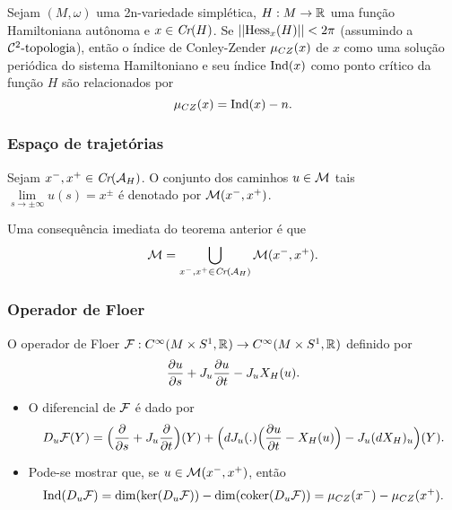 \documentclass{beamer}
\begin{document}
\begin{footnotesize}
\begin{frame}
		
		\begin{corolario}
			Sejam $(M,\omega)$ uma 2n-variedade simplética, $H:M\to \mathbb{R}^{}$ uma função Hamiltoniana autônoma e $x \in \textit{Cr}(H)$. Se $||\text{Hess}_{x}(H)||<2\pi$ (assumindo a $\mathcal{C}^{2}\text{-topologia}$), então o índice de Conley-Zender $\mu_{CZ}(x)$ de $x$ como uma solução periódica do sistema Hamiltoniano e seu índice $\text{Ind}(x)$ como ponto crítico da função $H$ são relacionados por
			$$
			\mu_{CZ}(x) = \text{Ind}(x)-n.
			$$
		\end{corolario}
	\end{frame}
	
	\begin{frame}
	\frametitle{Espaço de trajetórias}		
	Sejam $x^{-}, x^{+}\in \textit{Cr}(\mathcal{A}_{H})$. O conjunto dos caminhos $u \in \mathcal{M}$ tais $\lim\limits_{s\to \pm \infty}u(s) = x^{\pm}$ é denotado por $\mathcal{M}(x^{-}, x^{+})$.
			
			\begin{observacao}\label{observacao_uniao_orbitas_conectantes}
				Uma consequência imediata do teorema anterior é que 
				$$
				\mathcal{M} = \bigcup_{x^{-}, x^{+} \in \textit{Cr}(\mathcal{A}_{H})} \mathcal{M}(x^{-}, x^{+}).
				$$
			\end{observacao}
			
	\end{frame}
	
	\begin{frame}
		\frametitle{Operador de Floer}
		\begin{definition}
			O operador de Floer $\mathcal{F}:C^{\infty}(M\times S^{1}, \mathbb{R}^{})\to C^{\infty}(M\times S^{1}, \mathbb{R}^{})$ definido por 
			$$
			\frac{\partial u}{\partial s} + J_{u}\frac{\partial u}{\partial t} - J_{u}X_{H}(u).
			$$
		\end{definition}
		\begin{itemize}
			
		
			\item O diferencial de $\mathcal{F}$ é dado por 
			$$
			D_{u}\mathcal{F}(Y)= \Big( \frac{\partial }{\partial s} + J_{u}\frac{\partial }{\partial t}\Big)(Y)+ \Big(dJ_{u}(.)\Big( \frac{\partial u}{\partial t} - X_{H}(u) \Big) - J_{u} (dX_{H})_{u}\Big)(Y).
			$$
			
			\item Pode-se mostrar que, se $u\in \mathcal{M}(x^{-}, x^{+})$, então
			$$
			\text{Ind}{(D_{u}\mathcal{F})} = \dim(\ker(D_{u}\mathcal{F})) -\dim(\text{coker}(D_{u}\mathcal{F}))
			 = \mu_{CZ}(x^{-})-\mu_{CZ}(x^{+}).
			$$ 
			

\end{itemize}
\end{frame}
\end{footnotesize}
\end{document}
